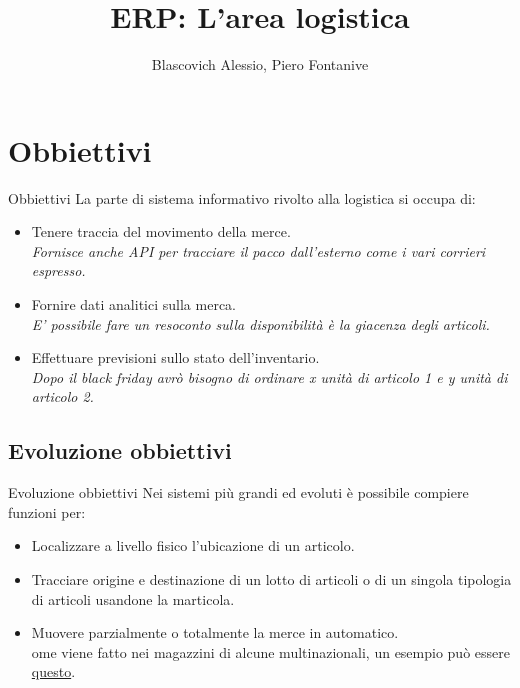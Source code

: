 \documentclass{beamer}
\title{ERP: L'area logistica}
\author{Blascovich Alessio, Piero Fontanive}
\date{}
\begin{document}
    \begin{frame}
        \titlepage
    \end{frame}

    \section{Obbiettivi}
    \begin{frame}{Obbiettivi}
        La parte di sistema informativo rivolto alla logistica si occupa di:
        \begin{itemize}
            \item Tenere traccia del movimento della merce.\\
                \textit{Fornisce anche API per tracciare il pacco dall'esterno come i vari corrieri espresso.}
            \item Fornire dati analitici sulla merca.\\
                \textit{E' possibile fare un resoconto sulla disponibilità è la giacenza degli articoli.}
            \item Effettuare previsioni sullo stato dell'inventario.\\
                \textit{Dopo il black friday avrò bisogno di ordinare x unità di articolo 1 e y unità di articolo 2.}
        \end{itemize}
    \end{frame}

    \subsection{Evoluzione obbiettivi}
    \begin{frame}{Evoluzione obbiettivi}
        Nei sistemi più grandi ed evoluti è possibile compiere funzioni per:
        \begin{itemize}
            \item Localizzare a livello fisico l'ubicazione di un articolo.
            \item Tracciare origine e destinazione di un lotto di articoli o di un singola tipologia di articoli usandone la marticola.
            \item Muovere parzialmente o totalmente la merce in automatico.\\
                ome viene fatto nei magazzini di alcune multinazionali, un esempio può essere \href{https://www.youtube.com/watch?v=YL9XjyXsKKk}{questo}.
        \end{itemize}
    \end{frame}
\end{document}
